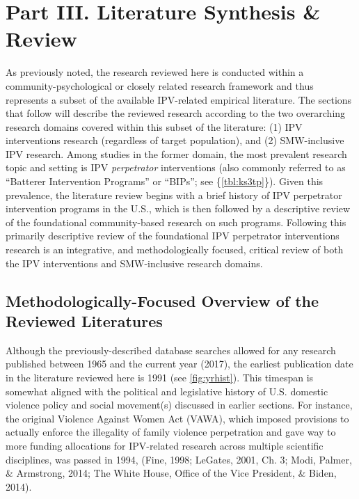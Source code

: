 \documentclass[11pt,]{tufte-book}
\begin{document}
\part{Part III. Literature Synthesis \& Review}

As previously noted, the research reviewed here is conducted within a
community-psychological or closely related research framework and thus
represents a subset of the available IPV-related empirical literature.
The sections that follow will describe the reviewed research according
to the two overarching research domains covered within this subset of
the literature: (1) IPV interventions research (regardless of target
population), and (2) SMW-inclusive IPV research. Among studies in the
former domain, the most prevalent research topic and setting is IPV
\emph{perpetrator} interventions (also commonly referred to as
``Batterer Intervention Programs'' or ``BIPs''; see
\{\cref{tbl:ks3tp}\}). Given this prevalence, the
literature review begins with a brief history of IPV perpetrator
intervention programs in the U.S., which is then followed by a
descriptive review of the foundational community-based research on such
programs. Following this primarily descriptive review of the
foundational IPV perpetrator interventions research is an integrative,
and methodologically focused, critical review of both the IPV
interventions and SMW-inclusive research domains.

\chapter{Methodologically-Focused Overview of the Reviewed
Literatures}\label{methodologically-focused-overview-of-the-reviewed-literatures}

Although the previously-described database searches allowed for any
research published between 1965 and the current year (2017), the
earliest publication date in the literature reviewed here is 1991 (see
\cref{fig:yrhist}). This timespan is somewhat aligned
with the political and legislative history of U.S. domestic violence
policy and social movement(s) discussed in earlier sections. For
instance, the original Violence Against Women Act (VAWA), which imposed
provisions to actually enforce the illegality of family violence
perpetration and gave way to more funding allocations for IPV-related
research across multiple scientific disciplines, was passed in 1994,
(Fine, 1998; LeGates, 2001, Ch. 3; Modi, Palmer, \& Armstrong, 2014; The
White House, Office of the Vice President, \& Biden, 2014).
\end{document}
